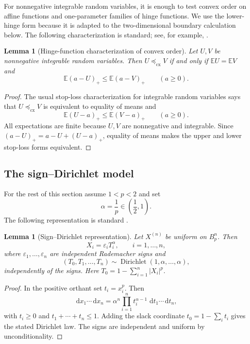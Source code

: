 \documentclass[pdflatex,sn-mathphys-num]{sn-jnl}
\numberwithin{equation}{section}
\theoremstyle{thmstyleone}
\newtheorem{lemma}[theorem]{Lemma}
\theoremstyle{thmstylethree}
\newcommand{\E}{\mathbb{E}}
\newcommand{\1}{\mathbf{1}}
\newcommand{\dd}{\,\mathrm{d}}
\newcommand{\eps}{\varepsilon}
\newcommand{\cx}{\preceq_{\mathrm{cx}}}
\begin{document}
For nonnegative integrable random variables, it is enough to test
convex order on affine functions and one-parameter families of hinge
functions. We use the lower-hinge form because it is adapted to the
two-dimensional boundary calculation below. The following
characterization is standard; see, for example,
\cite[Ch.~3]{ShakedShanthikumar}.

\begin{lemma}[Hinge-function characterization of convex order]\label{lem:app-stoploss}
Let $U,V$ be nonnegative integrable random variables. Then $U\cx V$ if and only if $\E U=\E V$ and
\[
 \E(a-U)_+\le \E(a-V)_+\qquad(a\ge0).
\]
\end{lemma}

\begin{proof}
The usual stop-loss characterization for integrable random variables says that $U\cx V$ is equivalent to equality of means and
\[
 \E(U-a)_+\le\E(V-a)_+\qquad(a\ge0).
\]
All expectations are finite because $U,V$ are nonnegative and integrable. Since $(a-U)_+=a-U+(U-a)_+$, equality of means makes the upper and lower stop-loss forms equivalent.
\end{proof}



\subsection{The sign--Dirichlet model}

For the rest of this section assume $1<p<2$ and set
\[
 \alpha=\frac1p\in\left(\frac12,1\right).
\]
The following representation is standard
\cite[Section~2]{BartheGuedonMendelsonNaor}.
\begin{lemma}[Sign--Dirichlet representation]\label{lem:app-dirichlet}
Let $X^{(n)}$ be uniform on $B_p^n$. Then
\[
 X_i=\eps_iT_i^{\alpha},\qquad i=1,\ldots,n,
\]
where $\eps_1,\ldots,\eps_n$ are independent Rademacher signs and
\[
 (T_0,T_1,\ldots,T_n)\sim\operatorname{Dirichlet}(1,\alpha,\ldots,\alpha),
\]
independently of the signs. Here $T_0=1-\sum_{i=1}^n |X_i|^p$.
\end{lemma}

\begin{proof}
In the positive orthant set $t_i=x_i^p$. Then
\[
 \dd x_1\cdots\dd x_n=\alpha^n\prod_{i=1}^n t_i^{\alpha-1}\,\dd t_1\cdots\dd t_n,
\]
with $t_i\ge0$ and $t_1+\cdots+t_n\le1$. Adding the slack coordinate $t_0=1-\sum_i t_i$ gives the stated Dirichlet law. The signs are independent and uniform by unconditionality.
\end{proof}
\end{document}
